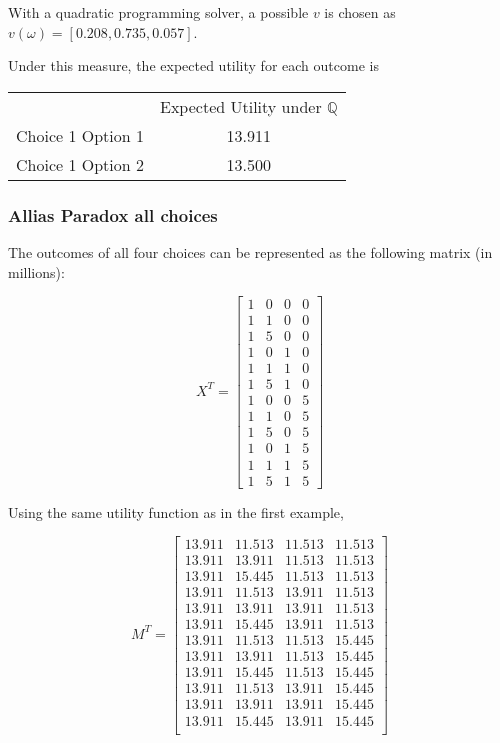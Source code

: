 \documentclass{article}
\begin{document}
With a quadratic programming solver, a possible \(v\) is chosen as \(v(\omega)=[0.208, 0.735, 0.057]\).

Under this measure, the expected utility for each outcome is 

\begin{center} 
	\begin{tabular}{c c}
		& Expected Utility under \(\mathbb{Q}\) \\
		Choice 1 Option 1 & 13.911 \\
		Choice 1 Option 2 & 13.500 \\
	\end{tabular}
\end{center}

\subsubsection{Allias Paradox all choices}

The outcomes of all four choices can be represented as the following matrix (in millions):

\[X^T=\begin{bmatrix}
1 & 0 & 0 & 0 \\
1 & 1 & 0 & 0 \\
1 & 5 & 0 & 0 \\
1 & 0 & 1 & 0 \\
1 & 1 & 1 & 0 \\
1 & 5 & 1 & 0 \\
1 & 0 & 0 & 5 \\
1 & 1 & 0 & 5 \\
1 & 5 & 0 & 5 \\
1 & 0 & 1 & 5 \\
1 & 1 & 1 & 5 \\
1 & 5 & 1 & 5
\end{bmatrix}\]

Using the same utility function as in the first example,

\[M^T=\begin{bmatrix}
	13.911 & 11.513 & 11.513 & 11.513  \\
	13.911 & 13.911  & 11.513 & 11.513 \\
	13.911 & 15.445 & 11.513 & 11.513 \\
	13.911 & 11.513 & 13.911 & 11.513 \\
	13.911 & 13.911  & 13.911 & 11.513 \\
	13.911 & 15.445  & 13.911 & 11.513 \\
	13.911 & 11.513 & 11.513  & 15.445 \\
	13.911 & 13.911  & 11.513  & 15.445 \\
	13.911 & 15.445  & 11.513  & 15.445 \\
	13.911 & 11.513  & 13.911  & 15.445 \\
	13.911 & 13.911  & 13.911  & 15.445 \\
	13.911 & 15.445  & 13.911  & 15.445 \\
\end{bmatrix}\]
\end{document}
